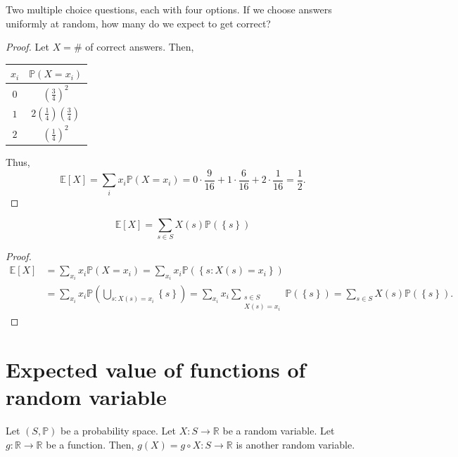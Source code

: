 \begin{eg}
    Two multiple choice questions, each with four options. If we choose answers uniformly at random, how many do we expect to get correct?
\end{eg}
\begin{proof}
    Let \(X = \#\) of correct answers. Then, 
    \renewcommand{\arraystretch}{1.5}
    \begin{table}[H]
        \centering
        \begin{tabular}{c|c}
            \toprule
                \(x_i\)  & \(\mathbb{P} (X = x_i)\)   \\
            \midrule
                \(0\)  & \(\left( \frac{3}{4} \right)^2 \)  \\

                \(1\)  & \(2 \left( \frac{1}{4} \right) \left( \frac{3}{4} \right)  \)   \\
                \(2\)  & \(\left( \frac{1}{4} \right)^2 \)   \\
            \bottomrule
        \end{tabular}
    \end{table} 
    Thus, 
    \[
        \mathbb{E} [X] = \sum_{i} x_i \mathbb{P} (X = x_i) = 0 \cdot \frac{9}{16} + 1 \cdot \frac{6}{16} + 2 \cdot \frac{1}{16} = \frac{1}{2}. 
    \]
\end{proof}

\begin{claim}
    \[
        \mathbb{E} [X] = \sum_{s \in S} X(s) \mathbb{P} (\left\{ s \right\} ) 
    \]
\end{claim}
\begin{proof}
        \begin{align*}
            \mathbb{E} [X] &= \sum_{x_i} x_i \mathbb{P} (X = x_i) = \sum_{x_i} x_i \mathbb{P} (\left\{ s : X(s) = x_i \right\} ) \\
            &= \sum_{x_i} x_i \mathbb{P} \left( \bigcup_{s: X(s) = x_i} \left\{ s \right\}   \right) = \sum_{x_i} x_i \sum_{\substack{s \in S \\ X(s) = x_i}} \mathbb{P} (\left\{ s \right\} ) = \sum_{s \in S} X(s) \mathbb{P} \left( \left\{ s \right\}  \right).    
        \end{align*}
\end{proof}

\section{Expected value of functions of random variable}
Let \((S, \mathbb{P} )\) be a probability space. Let \(X: S \to \mathbb{R} \) be a random variable. Let \(g: \mathbb{R} \to \mathbb{R} \) be a function. Then, \(g(X) = g \circ X: S \to \mathbb{R} \) is another random variable.

